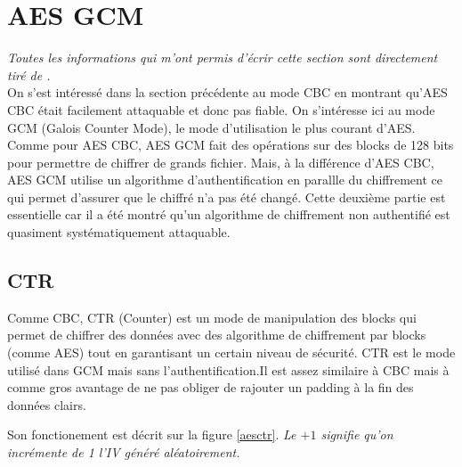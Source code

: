 \documentclass[a4paper, 12pt]{article}
\begin{document}
\section{AES GCM}
\noindent\emph{Toutes les informations qui m'ont permis d'écrir cette section sont directement tiré de \cite{courscourt}.}\\


On s'est intéressé dans la section précédente au mode CBC en montrant qu'AES CBC était facilement attaquable et donc pas fiable. On s'intéresse ici au mode GCM (Galois Counter Mode), le mode d'utilisation le plus courant d'AES. Comme pour AES CBC, AES GCM fait des opérations sur des blocks de 128 bits pour permettre de chiffrer de grands fichier. Mais, à la différence d'AES CBC, AES GCM utilise un algorithme d'authentification en parallle du chiffrement ce qui permet d'assurer que le chiffré n'a pas été changé. Cette deuxième partie est essentielle car il a été montré qu'un algorithme de chiffrement non authentifié est quasiment systématiquement attaquable.

\subsection{CTR} \label{CTR}
Comme CBC, CTR (Counter) est un mode de manipulation des blocks qui permet de chiffrer des données avec des algorithme de chiffrement par blocks (comme AES) tout en garantisant un certain niveau de sécurité. CTR est le mode utilisé dans GCM mais sans l'authentification.Il est assez similaire à CBC mais à comme gros avantage de ne pas obliger de rajouter un padding à la fin des données clairs.

Son fonctionement est décrit sur la figure \ref{aesctr}. \emph{Le $+1$ signifie qu'on incrémente de 1 l'IV généré aléatoirement.}
\end{document}
